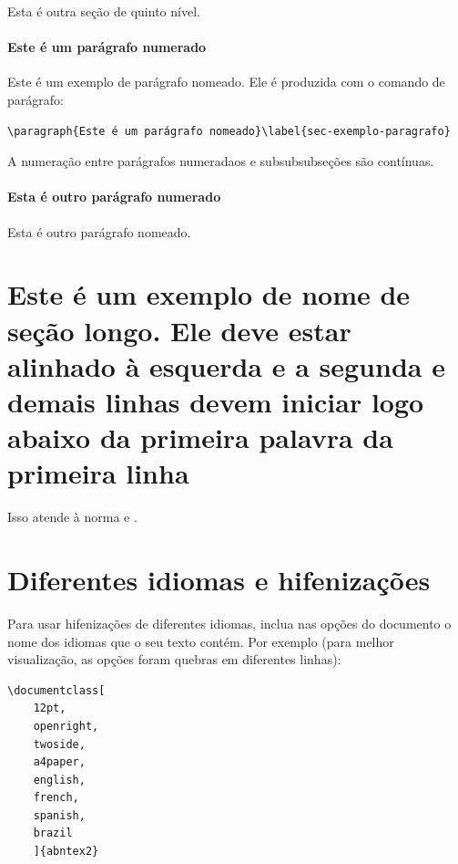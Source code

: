 Esta é outra seção de quinto nível.


\paragraph{Este é um parágrafo numerado}\label{sec-exemplo-paragrafo}

Este é um exemplo de parágrafo nomeado. Ele é produzida com o comando de
parágrafo:

\begin{verbatim}
\paragraph{Este é um parágrafo nomeado}\label{sec-exemplo-paragrafo}
\end{verbatim}

A numeração entre parágrafos numeradaos e subsubsubseções são contínuas.

\paragraph{Esta é outro parágrafo numerado}\label{sec-exemplo-paragrafo-outro}

Esta é outro parágrafo nomeado.

\section{Este é um exemplo de nome de seção longo. Ele deve estar
alinhado à esquerda e a segunda e demais linhas devem iniciar logo abaixo da
primeira palavra da primeira linha}

Isso atende à norma  
 e .

\section{Diferentes idiomas e hifenizações}
\label{sec-hifenizacao}

Para usar hifenizações de diferentes idiomas, inclua nas opções do documento o
nome dos idiomas que o seu texto contém. Por exemplo (para melhor
visualização, as opções foram quebras em diferentes linhas):

\begin{verbatim}
\documentclass[
	12pt,
	openright,
	twoside,
	a4paper,
	english,
	french,
	spanish,
	brazil
	]{abntex2}
\end{verbatim}

